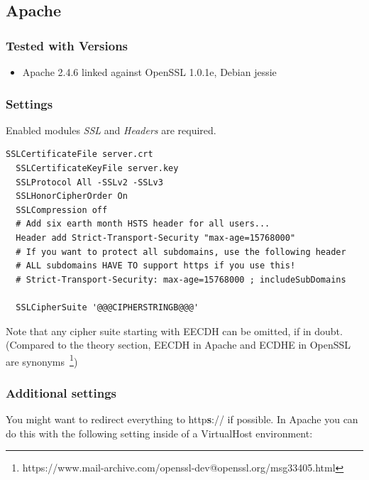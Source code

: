
\subsection{Apache}

\subsubsection{Tested with Versions} 
\begin{itemize}
\item Apache 2.4.6 linked against OpenSSL 1.0.1e, Debian jessie
\end{itemize}


\subsubsection{Settings} 

Enabled modules \emph{SSL} and \emph{Headers} are required.

\begin{lstlisting}[breaklines]
  SSLCertificateFile server.crt
  SSLCertificateKeyFile server.key
  SSLProtocol All -SSLv2 -SSLv3 
  SSLHonorCipherOrder On
  SSLCompression off
  # Add six earth month HSTS header for all users...
  Header add Strict-Transport-Security "max-age=15768000"
  # If you want to protect all subdomains, use the following header
  # ALL subdomains HAVE TO support https if you use this!
  # Strict-Transport-Security: max-age=15768000 ; includeSubDomains

  SSLCipherSuite '@@@CIPHERSTRINGB@@@'

\end{lstlisting}

Note that any cipher suite starting with EECDH can be omitted, if in doubt.
(Compared to the theory section, EECDH in Apache and ECDHE in OpenSSL are
synonyms~\footnote{https://www.mail-archive.com/openssl-dev@openssl.org/msg33405.html})

\subsubsection{Additional settings}

You might want to redirect everything to http\textbf{s}:// if possible. In Apache you can do this with the following setting inside of a VirtualHost environment:

